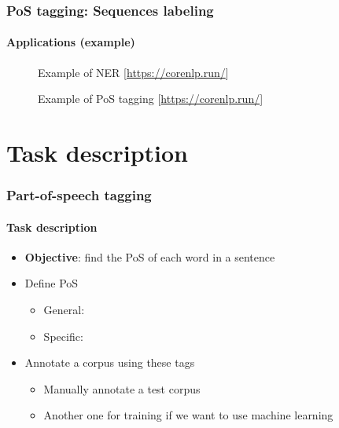 \documentclass[xcolor=table]{beamer}
\begin{document}
\begin{frame}
\frametitle{PoS tagging: Sequences labeling}
\framesubtitle{Applications (example)}

\begin{figure}
	\centering
	\caption{Example of NER [\url{https://corenlp.run/}]}
\end{figure}

\begin{figure}
	\centering
	\caption{Example of PoS tagging [\url{https://corenlp.run/}]}
\end{figure}

\end{frame}

%
%
%

\section{Task description}

\begin{frame}
\frametitle{Part-of-speech tagging}
\framesubtitle{Task description}

\begin{itemize}
	\item \textbf{Objective}: find the PoS of each word in a sentence
	\item Define PoS
	\begin{itemize}
		\item General: 
		\item Specific: 
	\end{itemize}
	\item Annotate a corpus using these tags
	\begin{itemize}
		\item Manually annotate a test corpus
		\item Another one for training if we want to use machine learning
	\end{itemize}
\end{itemize}

\end{frame}
\end{document}
